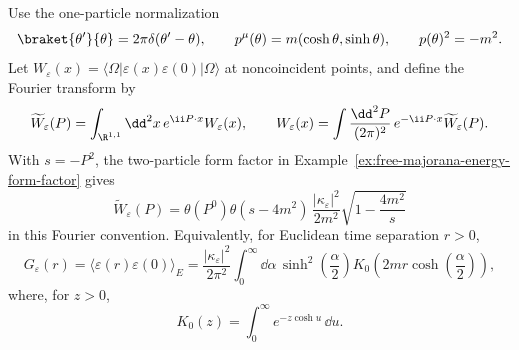 \begin{proposition}
\label{prop:majorana-energy-two-particle-reconstruction}
Use the one-particle normalization
\[
  \braket{\theta'}{\theta}=2\pi\delta(\theta'-\theta),
  \qquad
  p^\mu(\theta)=m(\cosh\theta,\sinh\theta),
  \qquad
  p(\theta)^2=-m^2 .
\]
Let \(W_\varepsilon(x)=\langle\Omega|\varepsilon(x)\varepsilon(0)|\Omega\rangle\)
at noncoincident points, and define the Fourier transform by
\[
  \widetilde W_\varepsilon(P)
  =
  \int_{\R^{1,1}}\dd^2x\,e^{\ii P\cdot x}W_\varepsilon(x),
  \qquad
  W_\varepsilon(x)
  =
  \int\frac{\dd^2P}{(2\pi)^2}\,
  e^{-\ii P\cdot x}\widetilde W_\varepsilon(P).
\]
With \(s=-P^2\), the two-particle form factor in
Example~\ref{ex:free-majorana-energy-form-factor} gives
\begin{equation}
  \widetilde W_\varepsilon(P)
  =
  \theta(P^0)\theta(s-4m^2)\,
  \frac{|\kappa_\varepsilon|^2}{2m^2}
  \sqrt{1-\frac{4m^2}{s}}
  \label{eq:majorana-energy-two-particle-spectral-density}
\end{equation}
in this Fourier convention.  Equivalently, for Euclidean time separation
\(r>0\),
\begin{equation}
  G_\varepsilon(r)
  =
  \langle\varepsilon(r)\varepsilon(0)\rangle_E
  =
  \frac{|\kappa_\varepsilon|^2}{2\pi^2}
  \int_0^\infty \dd\alpha\,
  \sinh^2\!\left(\frac{\alpha}{2}\right)
  K_0\!\left(2mr\cosh\!\left(\frac{\alpha}{2}\right)\right),
  \label{eq:majorana-energy-euclidean-bessel-reconstruction}
\end{equation}
where, for \(z>0\),
\[
  K_0(z)=\int_0^\infty e^{-z\cosh u}\,\dd u .
\]
\end{proposition}

